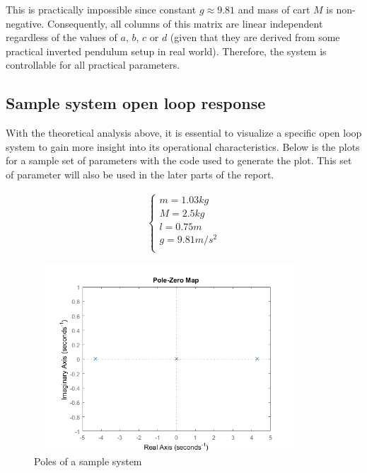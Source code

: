 \documentclass [12pt,letterpaper]{exam}
\begin{document}
This is practically impossible since constant $g \approx 9.81$ and mass of cart $M$ is non-negative. Consequently, all columns of this matrix are linear independent regardless of the values of $a$, $b$, $c$ or $d$ (given that they are derived from some practical inverted pendulum setup in real world). Therefore, the system is controllable for all practical parameters.

\subsection{Sample system open loop response}
With the theoretical analysis above, it is essential to visualize a specific open loop system to gain more insight into its operational characteristics. Below is the plots for a sample set of parameters with the code used to generate the plot. This set of parameter will also be used in the later parts of the report.

\begin{align}
\begin{cases}
m = 1.03kg \\
M = 2.5kg \\
l = 0.75m \\
g = 9.81m/s^2 \\
\end{cases}
\end{align}

\begin{figure}[H]
  \centering
    \includegraphics[width=10.15cm, height=7cm]{sample_poles} 
  \caption{Poles of a sample system}
  \label{fig:sample_poles}
\end{figure}
\end{document}
